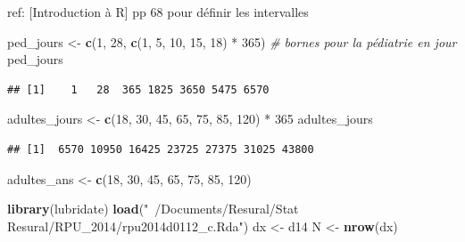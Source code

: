 \documentclass[]{article}
\newenvironment{Shaded}{\begin{snugshade}}{\end{snugshade}}
\newcommand{\KeywordTok}[1]{\textcolor[rgb]{0.13,0.29,0.53}{\textbf{{#1}}}}
\newcommand{\DecValTok}[1]{\textcolor[rgb]{0.00,0.00,0.81}{{#1}}}
\newcommand{\StringTok}[1]{\textcolor[rgb]{0.31,0.60,0.02}{{#1}}}
\newcommand{\CommentTok}[1]{\textcolor[rgb]{0.56,0.35,0.01}{\textit{{#1}}}}
\newcommand{\NormalTok}[1]{{#1}}
\begin{document}
ref: {[}Introduction à R{]} pp 68 pour définir les intervalles

\begin{Shaded}
\begin{Highlighting}[]
\NormalTok{ped_jours <-}\StringTok{ }\KeywordTok{c}\NormalTok{(}\DecValTok{1}\NormalTok{, }\DecValTok{28}\NormalTok{, }\KeywordTok{c}\NormalTok{(}\DecValTok{1}\NormalTok{, }\DecValTok{5}\NormalTok{, }\DecValTok{10}\NormalTok{, }\DecValTok{15}\NormalTok{, }\DecValTok{18}\NormalTok{) *}\StringTok{ }\DecValTok{365}\NormalTok{) }\CommentTok{# bornes pour la pédiatrie en jour}
\NormalTok{ped_jours}
\end{Highlighting}
\end{Shaded}

\begin{verbatim}
## [1]    1   28  365 1825 3650 5475 6570
\end{verbatim}

\begin{Shaded}
\begin{Highlighting}[]
\NormalTok{adultes_jours <-}\StringTok{ }\KeywordTok{c}\NormalTok{(}\DecValTok{18}\NormalTok{, }\DecValTok{30}\NormalTok{, }\DecValTok{45}\NormalTok{, }\DecValTok{65}\NormalTok{, }\DecValTok{75}\NormalTok{, }\DecValTok{85}\NormalTok{, }\DecValTok{120}\NormalTok{) *}\StringTok{ }\DecValTok{365}
\NormalTok{adultes_jours}
\end{Highlighting}
\end{Shaded}

\begin{verbatim}
## [1]  6570 10950 16425 23725 27375 31025 43800
\end{verbatim}

\begin{Shaded}
\begin{Highlighting}[]
\NormalTok{adultes_ans <-}\StringTok{ }\KeywordTok{c}\NormalTok{(}\DecValTok{18}\NormalTok{, }\DecValTok{30}\NormalTok{, }\DecValTok{45}\NormalTok{, }\DecValTok{65}\NormalTok{, }\DecValTok{75}\NormalTok{, }\DecValTok{85}\NormalTok{, }\DecValTok{120}\NormalTok{)}
\end{Highlighting}
\end{Shaded}

\begin{Shaded}
\begin{Highlighting}[]
\KeywordTok{library}\NormalTok{(lubridate)}
\KeywordTok{load}\NormalTok{(}\StringTok{"~/Documents/Resural/Stat Resural/RPU_2014/rpu2014d0112_c.Rda"}\NormalTok{)}
\NormalTok{dx <-}\StringTok{ }\NormalTok{d14}
\NormalTok{N <-}\StringTok{ }\KeywordTok{nrow}\NormalTok{(dx)}
\end{Highlighting}
\end{Shaded}
\end{document}
